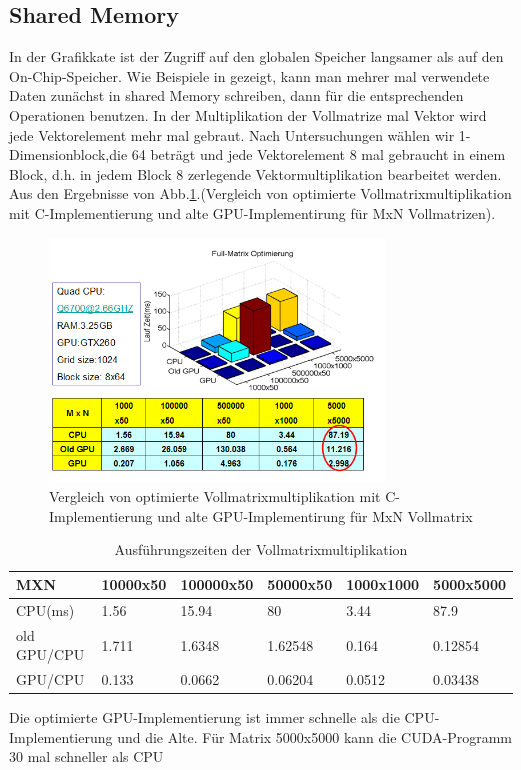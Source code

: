 \subsection{Shared Memory}
In der Grafikkate ist der Zugriff auf den globalen Speicher langsamer als auf den On-Chip-Speicher.  Wie Beispiele in \cite{cudapg} gezeigt, kann man mehrer mal verwendete Daten zunächst in shared Memory schreiben, dann für die entsprechenden Operationen benutzen. In der Multiplikation der Vollmatrize mal Vektor wird jede Vektorelement mehr mal gebraut. Nach Untersuchungen wählen wir 1-Dimensionblock,die 64 beträgt und jede Vektorelement 8 mal gebraucht in einem Block, d.h. in jedem Block 8 zerlegende Vektormultiplikation bearbeitet werden. Aus den Ergebnisse von Abb.\ref{sharememory}.(Vergleich von optimierte Vollmatrixmultiplikation mit C-Implementierung und alte GPU-Implementirung für MxN Vollmatrizen).
\begin{figure}[htbp]
\includegraphics[width=3.5in]{../xby/pic/sharememory}
\caption{Vergleich von optimierte Vollmatrixmultiplikation mit C-Implementierung und alte GPU-Implementirung für MxN Vollmatrix}
\label{sharememory}
\end{figure}


\begin{table}
\caption{Ausführungszeiten der Vollmatrixmultiplikation} 
\label{shared_memory}
\centering
\begin{tabular}{|p{46pt}p{28pt}p{30pt}p{28pt}p{30pt}p{30pt}|}
\toprule
	MXN& 10000x50& 100000x50& 50000x50& 1000x1000& 5000x5000\\

\midrule
CPU(ms)& 1.56&    15.94& 				80&      3.44& 87.9\\

old GPU/CPU& 1.711& 1.6348&   1.62548&  0.164&  0.12854\\

GPU/CPU & 0.133& 0.0662&     0.06204&   0.0512& 0.03438\\
\bottomrule
\end{tabular}
\end{table}

Die optimierte GPU-Implementierung ist immer schnelle als die CPU-Implementierung  und die Alte. Für Matrix 5000x5000 kann die CUDA-Programm 30 mal schneller als CPU

